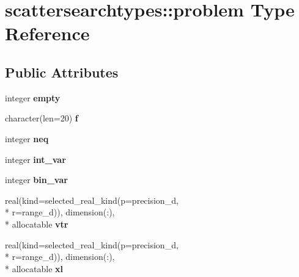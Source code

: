 \hypertarget{structscattersearchtypes_1_1problem}{\section{scattersearchtypes\-:\-:problem Type Reference}
\label{structscattersearchtypes_1_1problem}
}
\subsection*{Public Attributes}
\begin{DoxyCompactItemize}
\item 
\hypertarget{structscattersearchtypes_1_1problem_a6711f3f9cac902d3dd025cf6fe8b6fab}{integer {\bfseries empty}}\label{structscattersearchtypes_1_1problem_a6711f3f9cac902d3dd025cf6fe8b6fab}

\item 
\hypertarget{structscattersearchtypes_1_1problem_a9a4e04a60558d17745e8ab9f4f5975d1}{character(len=20) {\bfseries f}}\label{structscattersearchtypes_1_1problem_a9a4e04a60558d17745e8ab9f4f5975d1}

\item 
\hypertarget{structscattersearchtypes_1_1problem_af57a814dac41c32705f01c6b7964c968}{integer {\bfseries neq}}\label{structscattersearchtypes_1_1problem_af57a814dac41c32705f01c6b7964c968}

\item 
\hypertarget{structscattersearchtypes_1_1problem_ad48f8023c2f8ee7aa5c0ba86d278ee9d}{integer {\bfseries int\-\_\-var}}\label{structscattersearchtypes_1_1problem_ad48f8023c2f8ee7aa5c0ba86d278ee9d}

\item 
\hypertarget{structscattersearchtypes_1_1problem_a81e4d49f131881cfb868491092cf37bc}{integer {\bfseries bin\-\_\-var}}\label{structscattersearchtypes_1_1problem_a81e4d49f131881cfb868491092cf37bc}

\item 
\hypertarget{structscattersearchtypes_1_1problem_ac2365a8a49179bb729b4b7facba083b6}{real(kind=selected\-\_\-real\-\_\-kind(p=precision\-\_\-d, \\*
r=range\-\_\-d)), dimension(\-:), \\*
allocatable {\bfseries vtr}}\label{structscattersearchtypes_1_1problem_ac2365a8a49179bb729b4b7facba083b6}

\item 
\hypertarget{structscattersearchtypes_1_1problem_a8b7b3f847b247edd916533cbe518d3d2}{real(kind=selected\-\_\-real\-\_\-kind(p=precision\-\_\-d, \\*
r=range\-\_\-d)), dimension(\-:), \\*
allocatable {\bfseries xl}}\label{structscattersearchtypes_1_1problem_a8b7b3f847b247edd916533cbe518d3d2}


\end{DoxyCompactItemize}
